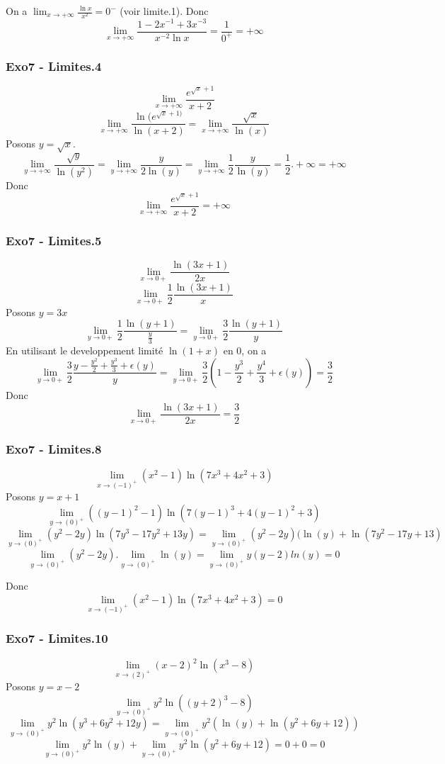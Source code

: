 \documentclass[]{book}
\theoremstyle{definition}
\begin{document}
On a $\lim_{x \to +\infty} \frac{\ln x}{x^2} = 0^{-}$ (voir limite.1).
Donc 
$$\lim_{x \to +\infty} \frac{1-2x^{-1}+3x^{-3}}{x^{-2}\ln x} = \frac{1}{0^{+}} = +\infty$$ 

\subsubsection*{Exo7 - Limites.4}
$$\lim_{x \to +\infty} \frac{e^{\sqrt{x}+1}}{x+2}$$
$$\lim_{x \to +\infty} \frac{\ln(e^{\sqrt{x}+1)}}{\ln(x+2)} = \lim_{x \to +\infty} \frac{\sqrt{x}}{\ln(x)}$$
Posons $y = \sqrt{x}$.
$$\lim_{y \to +\infty} \frac{\sqrt{y}}{\ln(y^2)} = \lim_{y \to +\infty} \frac{y}{2\ln(y)} = \lim_{y \to +\infty} \frac{1}{2}\frac{y}{\ln(y)} = \frac{1}{2} . +\infty = +\infty$$
Donc$$\lim_{x \to +\infty} \frac{e^{\sqrt{x}+1}}{x+2} = +\infty$$

\subsubsection*{Exo7 - Limites.5}
$$\lim_{x \to 0+} \frac{\ln(3x+1)}{2x}$$
$$\lim_{x \to 0+} \frac{1}{2}\frac{\ln(3x+1)}{x}$$
Posons $y=3x$
$$\lim_{y \to 0+} \frac{1}{2}\frac{\ln(y+1)}{\frac{y}{3}} = \lim_{y \to 0+} \frac{3}{2}\frac{\ln(y+1)}{y}$$
En utilisant le developpement limit\'e $\ln(1+x)$ en 0, on a
$$\lim_{y \to 0+} \frac{3}{2}\frac{y-\frac{y^2}{2}+ \frac{y^3}{3}+\epsilon(y)}{y} = \lim_{y \to 0+} \frac{3}{2}(1-\frac{y^3}{2} + \frac{y^4}{3}+\epsilon(y)) = \frac{3}{2}$$
Donc
$$\lim_{x \to 0+} \frac{\ln(3x+1)}{2x} = \frac{3}{2}$$


\subsubsection*{Exo7 - Limites.8}
$$\lim_{x \to (-1)^{+}} (x^2-1)\ln(7x^3+4x^2+3)$$
Posons $y=x+1$
$$\lim_{y \to (0)^{+}} ((y-1)^2-1)\ln(7(y-1)^3+4(y-1)^2+3)$$
$$\lim_{y \to (0)^{+}} (y^2-2y)\ln(7y^3-17y^2+13y) = \lim_{y \to (0)^{+}} (y^2-2y)(\ln(y)+\ln(7y^2-17y+13)$$
$$\lim_{y \to (0)^{+}} (y^2-2y). \lim_{y \to (0)^{+}}\ln(y) = \lim_{y \to (0)^{+}}y(y-2)ln(y) = 0$$

Donc
$$\lim_{x \to (-1)^{+}} (x^2-1)\ln(7x^3+4x^2+3) = 0$$

\subsubsection*{Exo7 - Limites.10}
$$\lim_{x \to (2)^{+}} (x-2)^2\ln(x^3-8)$$
Posons $y=x-2$
$$\lim_{y \to (0)^{+}} y^2\ln((y+2)^3-8)$$
$$\lim_{y \to (0)^{+}} y^2\ln(y^3+6y^2+12y) = \lim_{y \to (0)^{+}} y^2(\ln(y)+\ln(y^2+6y+12))$$
$$\lim_{y \to (0)^{+}} y^2\ln(y)+\lim_{y \to (0)^{+}}y^2\ln(y^2+6y+12) = 0 + 0 = 0$$
\end{document}
